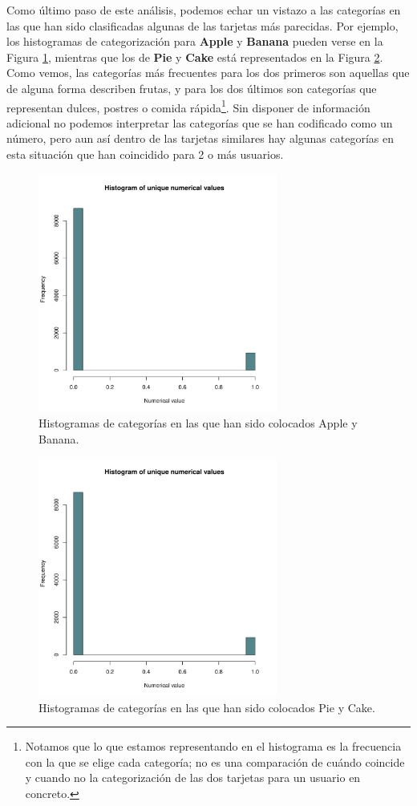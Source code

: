 \documentclass[11pt,a4paper]{article}
\begin{document}
Como último paso de este análisis, podemos echar un vistazo a las categorías en las que han sido clasificadas algunas de las tarjetas más parecidas. Por ejemplo, los histogramas de categorización para \textbf{Apple} y \textbf{Banana} pueden verse en la Figura \ref{fig:4}, mientras que los de \textbf{Pie} y \textbf{Cake} está representados en la Figura \ref{fig:5}. Como vemos, las categorías más frecuentes para los dos primeros son aquellas que de alguna forma describen frutas, y para los dos últimos son categorías que representan dulces, postres o comida rápida\footnote{Notamos que lo que estamos representando en el histograma es la frecuencia con la que se elige cada categoría; no es una comparación de cuándo coincide y cuando no la categorización de las dos tarjetas para un usuario en concreto.}. Sin disponer de información adicional no podemos interpretar las categorías que se han codificado como un número, pero aun así dentro de las tarjetas similares hay algunas categorías en esta situación que han coincidido para 2 o más usuarios.

\begin{figure}[h!]
  \centering
  \includegraphics[page=4, width=0.7\textwidth]{Rplots.pdf}
  \caption{Histogramas de categorías en las que han sido colocados Apple y Banana.}
  \label{fig:4}
\end{figure}

\begin{figure}[h!]
  \centering
  \includegraphics[page=5, width=0.7\textwidth]{Rplots.pdf}
  \caption{Histogramas de categorías en las que han sido colocados Pie y Cake.}
  \label{fig:5}
\end{figure}
\end{document}
